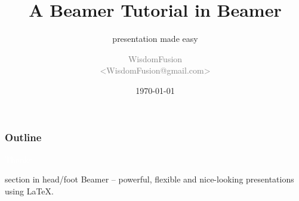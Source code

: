 \documentclass{beamer}
\title[Beamer Tutorial]{A Beamer Tutorial in Beamer}
\subtitle{presentation made easy}
\author[WisdomFusion]{
  \small \textcolor{gray}{WisdomFusion\\ <WisdomFusion@gmail.com>}
}
\date{\today}
\begin{document}
\begin{frame}
  \titlepage
\end{frame}

\begin{frame}
  \frametitle{Outline}

  \tableofcontents
\end{frame}

\begin{frame}[plain, b]
  \centering
  \Large \textcolor{white}{Thanks.}
  \normalsize

  \vspace*{\fill}

  \begin{beamercolorbox}[wd=\paperwidth]{section in head/foot}
    \centering
    \vskip8pt
    {\small Beamer -- powerful, flexible and nice-looking presentations using \LaTeX{}.}
    \vskip10pt
  \end{beamercolorbox}
  
\end{frame}
\end{document}
